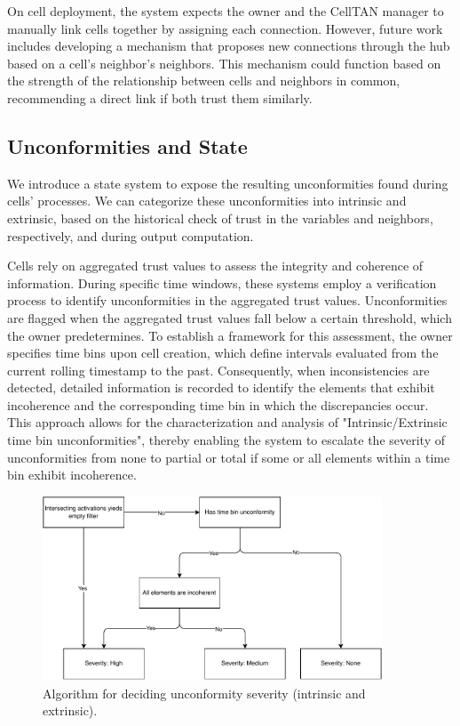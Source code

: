 On cell deployment, the system expects the owner and the CellTAN manager to manually link cells together by assigning each connection. However, future work includes developing a mechanism that proposes new connections through the hub based on a cell's neighbor's neighbors. This mechanism could function based on the strength of the relationship between cells and neighbors in common, recommending a direct link if both trust them similarly.

\subsection{Unconformities and State} \label{sec:states}

We introduce a state system to expose the resulting unconformities found during cells' processes. We can categorize these unconformities into intrinsic and extrinsic, based on the historical check of trust in the variables and neighbors, respectively, and during output computation.

Cells rely on aggregated trust values to assess the integrity and coherence of information. During specific time windows, these systems employ a verification process to identify unconformities in the aggregated trust values. Unconformities are flagged when the aggregated trust values fall below a certain threshold, which the owner predetermines. To establish a framework for this assessment, the owner specifies time bins upon cell creation, which define intervals evaluated from the current rolling timestamp to the past. Consequently, when inconsistencies are detected, detailed information is recorded to identify the elements that exhibit incoherence and the corresponding time bin in which the discrepancies occur. This approach allows for the characterization and analysis of "Intrinsic/Extrinsic time bin unconformities", thereby enabling the system to escalate the severity of unconformities from none to partial or total if some or all elements within a time bin exhibit incoherence.

\begin{figure}[h!]
\centering
    \includegraphics[width=0.9\textwidth]{figures/chapter4/cell/states.pdf}
    \caption{Algorithm for deciding unconformity severity (intrinsic and extrinsic).}
    \label{fig:severity}
\end{figure}

